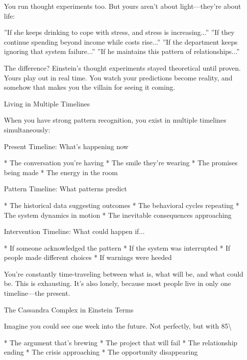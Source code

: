 \documentclass[12pt,oneside]{book}
\begin{document}
You run thought experiments too. But yours aren't about light---they're about life:

''If she keeps drinking to cope with stress, and stress is increasing...'' ''If they continue spending beyond income while costs rise...'' ''If the department keeps ignoring that system failure...'' ''If he maintains this pattern of relationships...''

The difference? Einstein's thought experiments stayed theoretical until proven. Yours play out in real time. You watch your predictions become reality, and somehow that makes you the villain for seeing it coming.

Living in Multiple Timelines

When you have strong pattern recognition, you exist in multiple timelines simultaneously:

Present Timeline: What's happening now

                    * The conversation you're having
                    * The smile they're wearing
                    * The promises being made
                    * The energy in the room

Pattern Timeline: What patterns predict

                    * The historical data suggesting outcomes
                    * The behavioral cycles repeating
                    * The system dynamics in motion
                    * The inevitable consequences approaching

Intervention Timeline: What could happen if...

                    * If someone acknowledged the pattern
                    * If the system was interrupted
                    * If people made different choices
                    * If warnings were heeded

You're constantly time-traveling between what is, what will be, and what could be. This is exhausting. It's also lonely, because most people live in only one timeline---the present.

The Cassandra Complex in Einstein Terms

Imagine you could see one week into the future. Not perfectly, but with 85\textbackslash{}%

                    * The argument that's brewing
                    * The project that will fail
                    * The relationship ending
                    * The crisis approaching
                    * The opportunity disappearing
\end{document}
